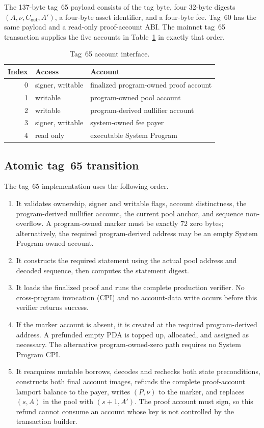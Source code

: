 The 137-byte tag~65 payload consists of the tag byte, four 32-byte digests
\((A,\nu,C_{\mathsf{out}},A')\), a four-byte asset identifier, and a four-byte
fee.  Tag~60 has the same payload and a read-only proof-account ABI.  The
mainnet tag~65 transaction supplies the five accounts in
Table~\ref{tab:tag65-accounts} in exactly that order.

\begin{table}[t]
  \centering
  \small
  \caption{Tag~65 account interface.}
  \label{tab:tag65-accounts}
  \begin{tabular}{r l l}
    \toprule
    Index & Access & Account \\
    \midrule
    0 & signer, writable& finalized program-owned proof account \\
    1 & writable        & program-owned pool account \\
    2 & writable        & program-derived nullifier account \\
    3 & signer, writable& system-owned fee payer \\
    4 & read only       & executable System Program \\
    \bottomrule
  \end{tabular}
\end{table}

\subsection{Atomic tag~65 transition}
\label{sec:implementation-atomic}

The tag~65 implementation uses the following order.
\begin{enumerate}
  \item It validates ownership, signer and writable flags, account
  distinctness, the program-derived nullifier account, the current pool anchor, and
  sequence non-overflow.  A program-owned marker must be exactly 72 zero
  bytes; alternatively, the required program-derived address may be an empty System
  Program-owned account.
  \item It constructs the required statement using the actual pool address
  and decoded sequence, then computes the statement digest.
  \item It loads the finalized proof and runs the complete production
  \Profile{} verifier.  No cross-program invocation (CPI) and no account-data
  write occurs before this
  verifier returns success.
  \item If the marker account is absent, it is created at the required
  program-derived address\@.
  A prefunded empty PDA is topped up, allocated, and assigned as necessary.
  The alternative program-owned-zero path requires no System Program CPI\@.
  \item It reacquires mutable borrows, decodes and rechecks both state
  preconditions, constructs both final account images, refunds the complete
  proof-account lamport balance to the payer, writes \((P,\nu)\) to the
  marker, and replaces \((s,A)\) in the pool with \((s+1,A')\).  The proof
  account must sign, so this refund cannot consume an account whose key is not
  controlled by the transaction builder.
\end{enumerate}

